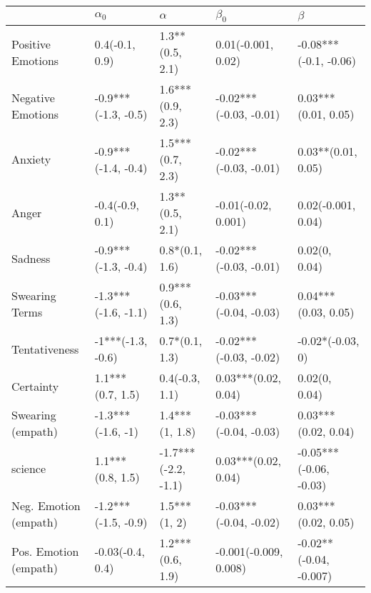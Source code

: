 \begin{tabular}{lllll}
\toprule
{} &           $\alpha_0$ &             $\alpha$ &               $\beta_0$ &                 $\beta$ \\
\midrule
Positive Emotions     &       0.4(-0.1, 0.9) &      1.3**(0.5, 2.1) &      0.01(-0.001, 0.02) &   -0.08***(-0.1, -0.06) \\
Negative Emotions     &  -0.9***(-1.3, -0.5) &     1.6***(0.9, 2.3) &  -0.02***(-0.03, -0.01) &     0.03***(0.01, 0.05) \\
Anxiety               &  -0.9***(-1.4, -0.4) &     1.5***(0.7, 2.3) &  -0.02***(-0.03, -0.01) &      0.03**(0.01, 0.05) \\
Anger                 &      -0.4(-0.9, 0.1) &      1.3**(0.5, 2.1) &     -0.01(-0.02, 0.001) &      0.02(-0.001, 0.04) \\
Sadness               &  -0.9***(-1.3, -0.4) &       0.8*(0.1, 1.6) &  -0.02***(-0.03, -0.01) &           0.02(0, 0.04) \\
Swearing Terms        &  -1.3***(-1.6, -1.1) &     0.9***(0.6, 1.3) &  -0.03***(-0.04, -0.03) &     0.04***(0.03, 0.05) \\
Tentativeness         &    -1***(-1.3, -0.6) &       0.7*(0.1, 1.3) &  -0.02***(-0.03, -0.02) &        -0.02*(-0.03, 0) \\
Certainty             &     1.1***(0.7, 1.5) &       0.4(-0.3, 1.1) &     0.03***(0.02, 0.04) &           0.02(0, 0.04) \\
Swearing (empath)     &    -1.3***(-1.6, -1) &       1.4***(1, 1.8) &  -0.03***(-0.04, -0.03) &     0.03***(0.02, 0.04) \\
science               &     1.1***(0.8, 1.5) &  -1.7***(-2.2, -1.1) &     0.03***(0.02, 0.04) &  -0.05***(-0.06, -0.03) \\
Neg. Emotion (empath) &  -1.2***(-1.5, -0.9) &         1.5***(1, 2) &  -0.03***(-0.04, -0.02) &     0.03***(0.02, 0.05) \\
Pos. Emotion (empath) &     -0.03(-0.4, 0.4) &     1.2***(0.6, 1.9) &   -0.001(-0.009, 0.008) &  -0.02**(-0.04, -0.007) \\
\bottomrule
\end{tabular}
